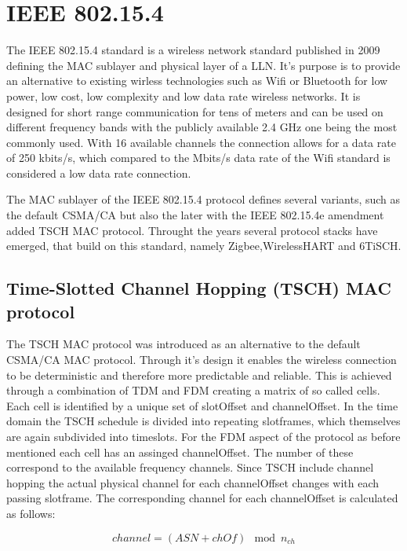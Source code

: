 \documentclass{comnets-thesis}
\begin{document}
\section{IEEE 802.15.4}
The IEEE 802.15.4 standard \cite{IEEE802} is a wireless network standard published in 2009 defining the \ac{MAC} sublayer and physical layer of a \ac{LLN}. It's purpose is to provide an alternative to existing wirless technologies such as Wifi or Bluetooth for low power, low cost, low complexity and low data rate wireless networks. 
It is designed for short range communication for tens of meters and can be used on different frequency bands with the publicly available 2.4 GHz one being the most commonly used. With 16 available channels the connection allows for a data rate of 250 kbits/s, which compared to the Mbits/s data rate of the Wifi standard is considered a low data rate connection.

The \ac{MAC} sublayer of the IEEE 802.15.4 protocol defines several variants, such as the default \ac{CSMA/CA} but also the later with the IEEE 802.15.4e amendment \cite{TSCH} added \ac{TSCH} \ac{MAC} protocol.
Throught the years several protocol stacks have emerged, that build on this standard, namely Zigbee,WirelessHART and \ac{6TiSCH}.



\subsection{Time-Slotted Channel Hopping (TSCH) MAC protocol}
The \acf{TSCH} \ac{MAC} protocol \cite{TSCH} was introduced as an alternative to the default \ac{CSMA/CA} \ac{MAC} protocol. Through it's design it enables the wireless connection to be deterministic \cite{TSCHIsDeterministic} and therefore more predictable and reliable.
This is achieved through a combination of \ac{TDM} and \ac{FDM} creating a matrix of so called cells. Each cell is identified by a unique set of slotOffset and channelOffset. 
In the time domain the \ac{TSCH} schedule is divided into repeating slotframes, which themselves are again subdivided into timeslots. 
For the \ac{FDM} aspect of the protocol as before mentioned each cell has an assinged channelOffset. The number of these correspond to the available frequency channels. Since \ac{TSCH} include channel hopping the actual physical channel for each channelOffset changes with each passing slotframe. The corresponding channel for each channelOffset is calculated as follows:

\begin{equation}
    channel = (ASN + chOf) \mod n_{ch}
	\label{eq:channel-hopping}
\end{equation}
\end{document}
